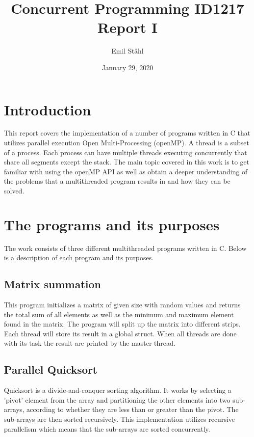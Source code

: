 \documentclass{article}
\title{\textbf{Concurrent Programming ID1217} \\ 
\textbf{Report I}}
\author{Emil Ståhl}
\date{January 29, 2020}
\begin{document}
\maketitle

\section{Introduction}

This report covers the implementation of a number of programs written in C that utilizes parallel execution Open Multi-Processing (openMP). A thread is a subset of a process. Each process can have multiple threads executing concurrently that share all segments except the stack. The main topic covered in this work is to get familiar with using the openMP API as well as obtain a deeper understanding of the problems that a multithreaded program results in and how they can be solved. 

\section{The programs and its purposes}

The work consists of three different multithreaded programs written in C. Below is a description of each program and its purposes.  

\subsection{Matrix summation}

This program initializes a matrix of given size with random values and returns the total sum of all elements as well as the minimum and maximum element found in the matrix. The program will split up the matrix into different strips. Each thread will store its result in a global struct. When all threads are done with its task the result are printed by the master thread. 

\subsection{Parallel Quicksort}

Quicksort is a divide-and-conquer sorting algorithm. It works by selecting a 'pivot' element from the array and partitioning the other elements into two sub-arrays, according to whether they are less than or greater than the pivot. The sub-arrays are then sorted recursively. This implementation utilizes recursive parallelism which means that the sub-arrays are sorted concurrently. 
\end{document}
